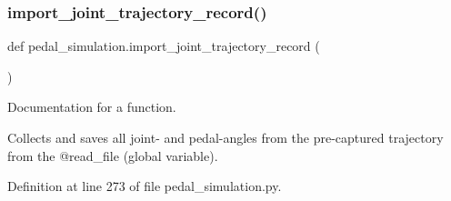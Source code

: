 \subsubsection{\texorpdfstring{import\_joint\_trajectory\_record()}{import\_joint\_trajectory\_record()}}
{\footnotesize\ttfamily def pedal\+\_\+simulation.\+import\+\_\+joint\+\_\+trajectory\+\_\+record (\begin{DoxyParamCaption}{ }\end{DoxyParamCaption})}



Documentation for a function. 

Collects and saves all joint-\/ and pedal-\/angles from the pre-\/captured trajectory from the @read\+\_\+file (global variable). 

Definition at line 273 of file pedal\+\_\+simulation.\+py.


